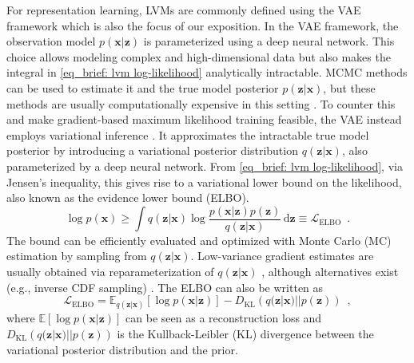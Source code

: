 {For representation learning, LVMs are commonly defined using the VAE framework \parencite{kingma_autoencoding_2014, rezende_stochastic_2014} which is also the focus of our exposition. 
In the VAE framework, the observation model $p(\mathbf{x}|\mathbf{z})$ is parameterized using a deep neural network. This choice allows modeling complex and high-dimensional data but also makes the integral in \cref{eq_brief: lvm log-likelihood} analytically intractable. MCMC methods can be used to estimate it and the true model posterior $p(\mathbf{z}|\mathbf{x})$, but these methods are usually computationally expensive in this setting \parencite{mohamed_monte_2019}. 
To counter this and make gradient-based maximum likelihood training feasible, the VAE instead employs variational inference \parencite{jordan_introduction_1999}. It approximates the intractable true model posterior by introducing a variational posterior distribution $q(\mathbf{z}|\mathbf{x})$, also parameterized by a deep neural network. From \cref{eq_brief: lvm log-likelihood}, via Jensen's inequality, this gives rise to a variational lower bound on the likelihood, also known as the evidence lower bound (ELBO).
\begin{equation}
    \log p(\mathbf{x}) \geq \int q(\mathbf{z}|\mathbf{x}) \log \frac{p(\mathbf{x}| \mathbf{z})p(\mathbf{z})}{q(\mathbf{z}|\mathbf{x})} \,\text{d}\mathbf{z} \equiv \mathcal{L}_{\text{ELBO}} \enspace . \label{eq_brief: lvm likelihood bound (elbo)}
\end{equation}
The bound can be efficiently evaluated and optimized with Monte Carlo (MC) estimation by sampling from $q(\mathbf{z}|\mathbf{x})$. Low-variance gradient estimates are usually obtained via reparameterization of $q(\mathbf{z}|\mathbf{x})$ \parencite{kingma_autoencoding_2014}, although alternatives exist (e.g., inverse CDF sampling) \parencite{mohamed_monte_2019}. 
The ELBO can also be written as
\begin{equation}
    \mathcal{L}_{\text{ELBO}} = \mathbb{E}_{q(\mathbf{z}|\mathbf{x})}\left[ \log p(\mathbf{x}|\mathbf{z}) \right] - D_\text{KL}\left( q(\mathbf{z}|\mathbf{x}) || p(\mathbf{z}) \right) \enspace  \label{eq_brief: lvm likelihood bound recon/kl form (elbo)},
\end{equation}
where $\mathbb{E}\left[ \log p(\mathbf{x}|\mathbf{z}) \right]$ can be seen as a reconstruction loss and $D_\text{KL}\left( q(\mathbf{z}|\mathbf{x})||p(\mathbf{z}) \right)$ is the Kullback-Leibler (KL) divergence between the variational posterior distribution and the prior.

}
